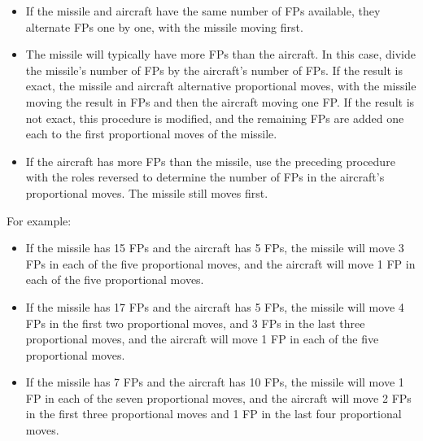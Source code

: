 {\begin{itemize}
\item If the missile and aircraft have the same number of FPs available, they alternate FPs one by one, with the missile moving first.

\item The missile will typically have more FPs than the aircraft. In this case, divide the missile's number of FPs by the aircraft's number of FPs. If the result is exact, the missile and aircraft alternative proportional moves, with the missile moving the result in FPs and then the aircraft moving one FP. If the result is not exact, this procedure is modified, and the remaining FPs are added one each to the first proportional moves of the missile.

\item If the aircraft has more FPs than the missile, use the preceding procedure with the roles reversed to determine the number of FPs in the aircraft's proportional moves. The missile still moves first.

\end{itemize}

For example:
\begin{itemize}
    \item If the missile has 15 FPs and the aircraft has 5 FPs, the missile will move 3 FPs in each of the five proportional moves, and the aircraft will move 1 FP in each of the five proportional moves.
    \item If the missile has 17 FPs and the aircraft has 5 FPs, the missile will move 4 FPs in the first two proportional moves, and 3 FPs in the last three proportional moves, and the aircraft will move 1 FP in each of the five proportional moves.
    \item If the missile has 7 FPs and the aircraft has 10 FPs, the missile will move 1 FP in each of the seven proportional moves, and the aircraft will move 2 FPs in the first three proportional moves and 1 FP in the last four proportional moves.
\end{itemize}

}


